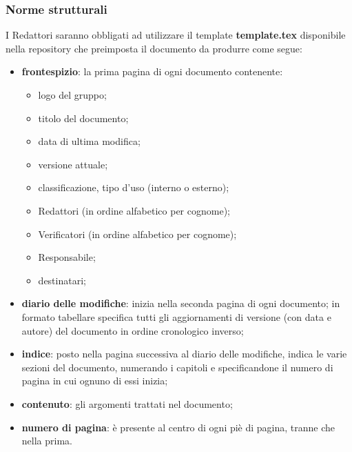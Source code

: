 	\subsubsection{Norme strutturali}
	I Redattori saranno obbligati ad utilizzare il template \textbf{template.tex} disponibile nella repository che preimposta il documento da produrre come segue:
	\begin{itemize}
		\item \textbf{frontespizio}: la prima pagina di ogni documento contenente:
			\begin{itemize}
				\item logo del gruppo;
				\item titolo del documento;
				\item data di ultima modifica;
				\item versione attuale;
				\item classificazione, tipo d'uso (interno o esterno);
				\item Redattori (in ordine alfabetico per cognome);
				\item Verificatori (in ordine alfabetico per cognome);
				\item Responsabile;
                \item destinatari;
			\end{itemize}
		\item \textbf{diario delle modifiche}: inizia nella seconda pagina di ogni documento; in formato tabellare specifica tutti gli aggiornamenti di versione (con data e autore) del documento in ordine cronologico inverso;
		\item \textbf{indice}: posto nella pagina successiva al diario delle modifiche, indica le varie sezioni del documento, numerando i capitoli e specificandone il numero di pagina in cui ognuno di essi inizia;
		\item \textbf{contenuto}: gli argomenti trattati nel documento;
		\item \textbf{numero di pagina}: è presente al centro di ogni piè di pagina, tranne che nella prima.
	\end{itemize}

